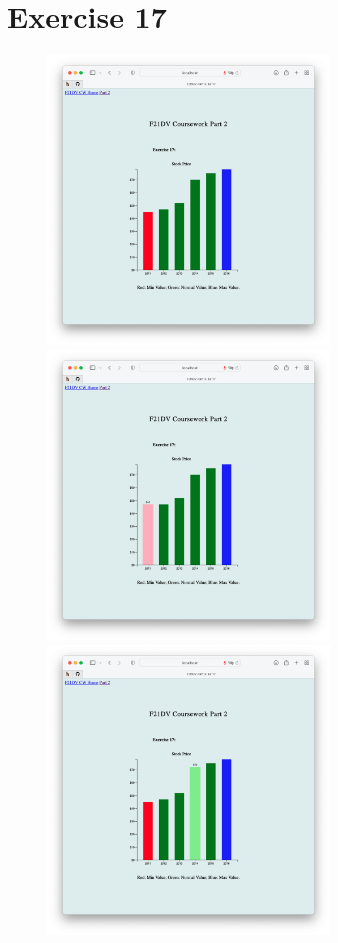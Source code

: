 \documentclass{scrreprt}
\begin{document}
\section{Exercise 17}
\begin{figure}[!ht]
    \centering
    \includegraphics[width = 7.5cm]{images/ex17_1.png}
    \includegraphics[width = 7.5cm]{images/ex17_2.png}
    \includegraphics[width = 7.5cm]{images/ex17_3.png}

\end{figure}
\end{document}
